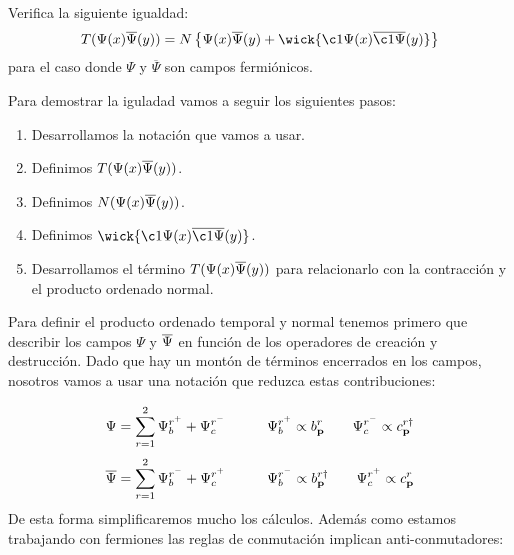 
\begin{ejercicio} 
	Verifica la siguiente igualdad:
	\begin{equation*}
		T(\Psi(x) \aPsi(y)) = N\left\lbrace \Psi (x)\overline{\Psi} (y)+ \wick{\c1{\Psi} (x) \overline{\c1{\Psi}} (y)} \right\rbrace
	\end{equation*}
	para el caso donde $\Psi$ y $\overline{\Psi}$ son campos fermiónicos.
\end{ejercicio}
\begin{solucion} 
	Para demostrar la iguladad vamos a seguir los siguientes pasos:
	\begin{enumerate}
		\item Desarrollamos la notación que vamos a usar.
		\item Definimos $T(\Psi(x) \overline{\Psi}(y))$.
		\item Definimos $N(\Psi(x) \overline{\Psi}(y))$.
		\item Definimos $\wick{\c1{\Psi} (x) \overline{\c1{\Psi}} (y)}$.
		\item Desarrollamos el término $T(\Psi(x) \overline{\Psi}(y))$ para relacionarlo con la contracción y el producto ordenado normal.
	\end{enumerate}
	Para definir el producto ordenado temporal y normal tenemos primero que describir los campos $\Psi$ y $\overline{\Psi}$ en función de los operadores de creación y destrucción. Dado que hay un montón de términos encerrados en los campos, nosotros vamos a usar una notación que reduzca estas contribuciones:
	
	\begin{equation*}
		\Psi = \sum_{r=1}^2 \Psi_b^{r^+} + \Psi_c^{r^-} \quad \quad \quad \Psi_b^{r^+}  \propto b^r_{\mathbf{p}} \quad \quad \Psi_c^{r^-} \propto c_{\mathbf{p}}^{r\dagger}
	\end{equation*}
	\begin{equation*}
		\overline{\Psi} = \sum_{r=1}^2 \Psi_b^{r^-}+\Psi_c^{r^+}\quad \quad \quad \Psi_b^{r^-}  \propto b^{r\dagger}_{\mathbf{p}} \quad \quad \Psi_c^{r^+} \propto c_{\mathbf{p}}^{r}
	\end{equation*}
	De esta forma simplificaremos mucho los cálculos. Además como estamos trabajando con fermiones las reglas de conmutación implican anti-conmutadores:
	

\end{solucion}
